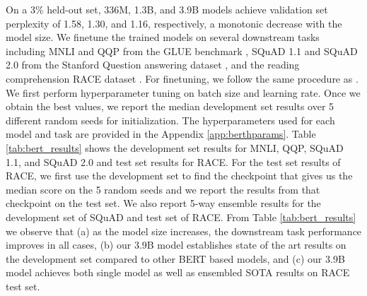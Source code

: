 On a 3\% held-out set, 336M, 1.3B, and 3.9B models achieve validation set perplexity of 1.58, 1.30, and 1.16, respectively, a monotonic decrease with the model size. We finetune the trained models on several downstream tasks including MNLI and QQP from the GLUE benchmark \cite{GLUE2019}, SQuAD 1.1 and SQuAD 2.0 from the Stanford Question answering dataset \cite{SQUAD1,SQUAD2}, and the reading comprehension RACE dataset \cite{RACE}. For finetuning, we follow the same procedure as \cite{roberta}. We first perform hyperparameter tuning on batch size and learning rate. Once we obtain the best values, we report the median development set results over 5 different random seeds for initialization. The hyperparameters used for each model and task are provided in the Appendix \ref{app:berthparams}. Table \ref{tab:bert_results} shows the development set results for MNLI, QQP, SQuAD 1.1, and SQuAD 2.0 and test set results for RACE. For the test set results of RACE, we first use the development set to find the checkpoint that gives us the median score on the 5 random seeds and we report the results from that checkpoint on the test set. We also report 5-way ensemble results for the development set of SQuAD and test set of RACE. From Table \ref{tab:bert_results} we observe that (a) as the model size increases, the downstream task performance improves in all cases, (b) our 3.9B model establishes state of the art results on the development set compared to other BERT based models, and (c) our 3.9B model achieves both single model as well as ensembled  SOTA results on RACE test set. 

